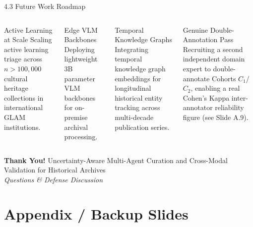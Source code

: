 \documentclass[aspectratio=169,11pt]{beamer}
\begin{document}
\begin{frame}{4.3 Future Work Roadmap}
\footnotesize
\begin{columns}[T]
\begin{block}{Active Learning at Scale}
Scaling active learning triage across $n > 100{,}000$ cultural heritage collections in international GLAM institutions.
\end{block}

\begin{block}{Edge VLM Backbones}
Deploying lightweight 3B parameter VLM backbones for on-premise archival processing.
\end{block}

\begin{block}{Temporal Knowledge Graphs}
Integrating temporal knowledge graph embeddings for longitudinal historical entity tracking across multi-decade publication series.
\end{block}

\begin{block}{Genuine Double-Annotation Pass}
Recruiting a second independent domain expert to double-annotate Cohorts $C_1$/$C_2$, enabling a real Cohen's Kappa inter-annotator reliability figure (see Slide A.9).
\end{block}
\end{columns}
\end{frame}

\begin{frame}
\centering
\Large
\textbf{Thank You!}
\vskip 0.5cm
\normalsize
Uncertainty-Aware Multi-Agent Curation and Cross-Modal Validation for Historical Archives\\
\vskip 0.3cm
\small
\textit{Questions \& Defense Discussion}
\end{frame}

\section{Appendix / Backup Slides}
\end{document}
